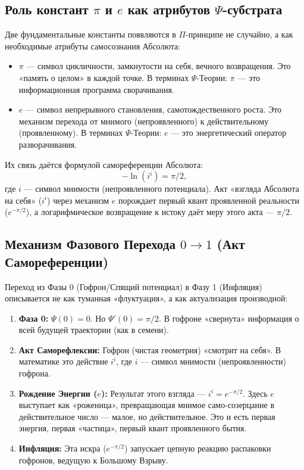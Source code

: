 \documentclass[a4paper,12pt]{article}
\begin{document}
\subsection{Роль констант $\pi$ и $e$ как атрибутов $\Psi$-субстрата}

Две фундаментальные константы появляются в $\Pi$-принципе не случайно, а как необходимые атрибуты самосознания Абсолюта:
\begin{itemize}
	\item $\pi$ — символ цикличности, замкнутости на себя, вечного возвращения. Это «память о целом» в каждой точке. В терминах $\Psi$-Теории: $\pi$ — это информационная программа сворачивания.
	\item $e$ — символ непрерывного становления, самотождественного роста. Это механизм перехода от мнимого (непроявленного) к действительному (проявленному). В терминах $\Psi$-Теории: $e$ — это энергетический оператор разворачивания.
\end{itemize}

Их связь даётся формулой самореференции Абсолюта:
\[
-\ln(i^i) = \pi/2,
\]
где $i$ — символ мнимости (непроявленного потенциала). Акт «взгляда Абсолюта на себя» ($i^i$) через механизм $e$ порождает первый квант проявленной реальности ($e^{-\pi/2}$), а логарифмическое возвращение к истоку даёт меру этого акта — $\pi/2$.

\subsection{Механизм Фазового Перехода $0 \to 1$ (Акт Самореференции)}

Переход из Фазы 0 (Гофрон/Спящий потенциал) в Фазу 1 (Инфляция) описывается не как туманная «флуктуация», а как актуализация производной:

\begin{enumerate}
	\item \textbf{Фаза 0:} $\Psi(0) = 0$. Но $\Psi'(0) = \pi/2$. В гофроне «свернута» информация о всей будущей траектории (как в семени).
	\item \textbf{Акт Саморефлексии:} Гофрон (чистая геометрия) «смотрит на себя». В математике это действие $i^i$, где $i$ — символ мнимости (непроявленности) гофрона.
	\item \textbf{Рождение Энергии ($e$):} Результат этого взгляда — $i^i = e^{-\pi/2}$. Здесь $e$ выступает как «роженица», превращающая мнимое само-созерцание в действительное число — малое, но действительное. Это и есть первая энергия, первая «частица», первый квант проявленного бытия.
	\item \textbf{Инфляция:} Эта искра ($e^{-\pi/2}$) запускает цепную реакцию распаковки гофронов, ведущую к Большому Взрыву.
\end{enumerate}
\end{document}
